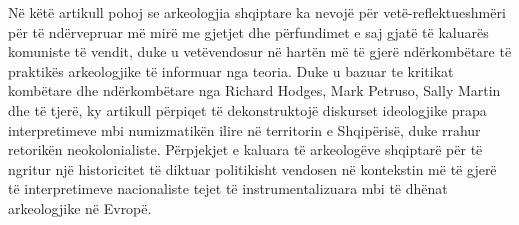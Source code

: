 \myseparator
\begin{myabstract}  
			Në këtë artikull pohoj se arkeologjia shqiptare ka nevojë për vetë-reflektueshmëri për të ndërve\-pruar më mirë me gjetjet dhe përfundimet e saj gjatë të kaluarës komuniste të vendit, duke u vetëvendosur në hartën më të gjerë ndërkombëtare të praktikës arkeologjike të informuar nga teoria. Duke u bazuar te kritikat kombëtare dhe ndërkombëtare nga Richard Hodges, Mark Petruso, Sally Martin dhe të tjerë, ky artikull përpiqet të dekonstruktojë diskurset ideologjike prapa interpretimeve mbi numizmatikën ilire në territorin e Shqipërisë, duke rrahur retorikën neokolonialiste. Përpjekjet e kaluara të arkeologëve shqiptarë për të ngritur një historicitet të diktuar politikisht vendosen në kontekstin më të gjerë të interpretimeve nacionaliste tejet të instrumentalizuara mbi të dhënat arkeologjike në Evropë.
			
				
	\end{myabstract}


\printbibliography[heading=subbibnumbered] 
\label{bekteshi:lastpage}
\closingarticle
